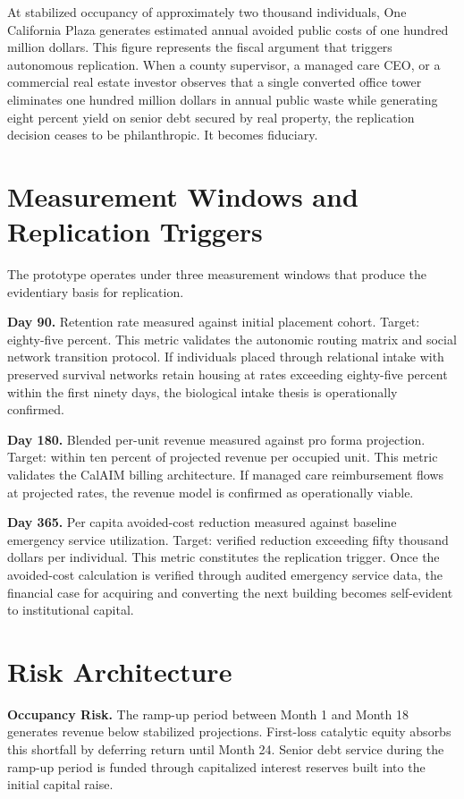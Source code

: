 \documentclass[12pt, letterpaper]{article}
\begin{document}
At stabilized occupancy of approximately two thousand individuals, One California Plaza generates estimated annual avoided public costs of one hundred million dollars. This figure represents the fiscal argument that triggers autonomous replication. When a county supervisor, a managed care CEO, or a commercial real estate investor observes that a single converted office tower eliminates one hundred million dollars in annual public waste while generating eight percent yield on senior debt secured by real property, the replication decision ceases to be philanthropic. It becomes fiduciary.

\clearpage
\section{Measurement Windows and Replication Triggers}

The prototype operates under three measurement windows that produce the evidentiary basis for replication.

\textbf{Day 90.} Retention rate measured against initial placement cohort. Target: eighty-five percent. This metric validates the autonomic routing matrix and social network transition protocol. If individuals placed through relational intake with preserved survival networks retain housing at rates exceeding eighty-five percent within the first ninety days, the biological intake thesis is operationally confirmed.

\textbf{Day 180.} Blended per-unit revenue measured against pro forma projection. Target: within ten percent of projected revenue per occupied unit. This metric validates the CalAIM billing architecture. If managed care reimbursement flows at projected rates, the revenue model is confirmed as operationally viable.

\textbf{Day 365.} Per capita avoided-cost reduction measured against baseline emergency service utilization. Target: verified reduction exceeding fifty thousand dollars per individual. This metric constitutes the replication trigger. Once the avoided-cost calculation is verified through audited emergency service data, the financial case for acquiring and converting the next building becomes self-evident to institutional capital.

\clearpage
\section{Risk Architecture}

\textbf{Occupancy Risk.} The ramp-up period between Month 1 and Month 18 generates revenue below stabilized projections. First-loss catalytic equity absorbs this shortfall by deferring return until Month 24. Senior debt service during the ramp-up period is funded through capitalized interest reserves built into the initial capital raise.
\end{document}
